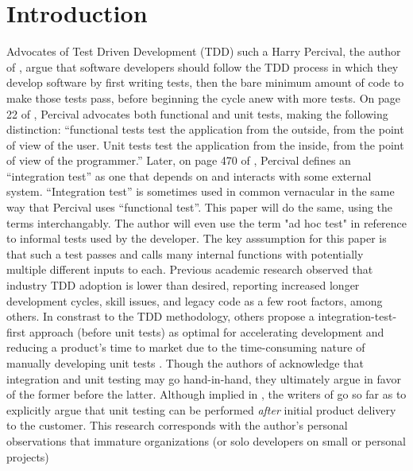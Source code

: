\section{Introduction}\label{sec:introduction}

Advocates of Test Driven Development (TDD) such a Harry Percival, the 
author of \cite{percival2014test}, argue that software developers should
follow the TDD process in which they develop software by first writing tests,
then the bare minimum amount of code to make those tests pass,
before beginning the cycle anew with more tests.
%
On page 22 of \cite{percival2014test}, Percival advocates both functional and
 unit tests, making the following distinction:
“functional tests test the application from the outside, from the point of view
of the user. Unit tests test the application from the inside,
from the point of view of the programmer.”
%
Later, on page 470 of \cite{percival2014test}, Percival defines an “integration test” as
one that depends on and interacts with some external system.
%
“Integration test” is sometimes used in common vernacular in the same way that
Percival uses “functional test”.
%
This paper will do the same, using the terms interchangably.  The author will 
even use the term "ad hoc test" in reference to informal tests used by the developer.  
The key asssumption for this paper is that such a test passes and calls many
internal functions with potentially multiple different inputs to each.
%
Previous academic research \cite{causevic2011factors, ramzan2024test} observed
 that industry TDD adoption is lower than desired,
reporting increased longer development cycles, skill issues, and legacy code as 
a few root factors, among others.
%
In constrast to the TDD methodology, 
others \cite{brown2013agility, shahabuddin2016integration} propose a 
integration-test-first approach (before unit tests)
as optimal for accelerating development 
and reducing a product's time to market due to the time-consuming nature of manually
developing unit tests \cite{kahur2023java, shahabuddin2016integration}.
Though the authors of \cite{brown2013agility}
acknowledge that integration and unit testing may go hand-in-hand, they 
ultimately argue in favor of the former before the latter.  
Although implied in \cite{brown2013agility}, the writers of 
\cite{shahabuddin2016integration} go so far as to explicitly argue that unit
testing can be performed \textit{after} initial product delivery to the customer.
%
This research corresponds with the author’s personal observations that immature 
organizations (or solo developers on small or personal projects)

